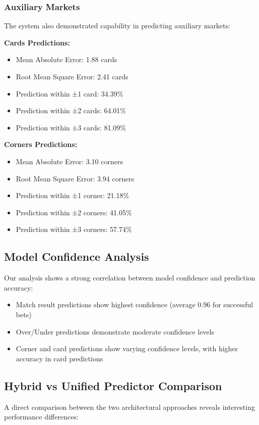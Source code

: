 \documentclass[conference]{IEEEtran}
\begin{document}
\subsubsection{Auxiliary Markets}
The system also demonstrated capability in predicting auxiliary markets:

\textbf{Cards Predictions:}
\begin{itemize}
\item Mean Absolute Error: 1.88 cards
\item Root Mean Square Error: 2.41 cards
\item Prediction within ±1 card: 34.39\%
\item Prediction within ±2 cards: 64.01\%
\item Prediction within ±3 cards: 81.09\%
\end{itemize}

\textbf{Corners Predictions:}
\begin{itemize}
\item Mean Absolute Error: 3.10 corners
\item Root Mean Square Error: 3.94 corners
\item Prediction within ±1 corner: 21.18\%
\item Prediction within ±2 corners: 41.05\%
\item Prediction within ±3 corners: 57.74\%
\end{itemize}

\subsection{Model Confidence Analysis}
Our analysis shows a strong correlation between model confidence and prediction accuracy:

\begin{itemize}
\item Match result predictions show highest confidence (average 0.96 for successful bets)
\item Over/Under predictions demonstrate moderate confidence levels
\item Corner and card predictions show varying confidence levels, with higher accuracy in card predictions
\end{itemize}

\subsection{Hybrid vs Unified Predictor Comparison}
A direct comparison between the two architectural approaches reveals interesting performance differences:
\end{document}
